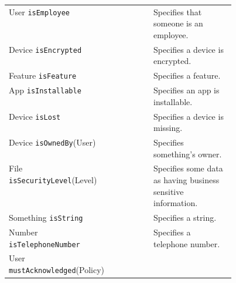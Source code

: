 \documentclass{llncs}
\newcommand{\cmark}{\ding{51}}%
\begin{document}
\begin{table}
\begin{tabular}{l c c c c c p{0.45\linewidth} }
    User \texttt{isEmployee}                    & \cmark                 & \cmark                  &                     & \cmark            & \cmark
    & Specifies that someone is an employee.                                               \\
    Device \texttt{isEncrypted}                 &                        & \cmark                  &                     & \cmark            & \cmark
    & Specifies a device is encrypted.                                                     \\
    Feature \texttt{isFeature}                  & \cmark                 &                         &                     &                   & \cmark
    & Specifies a feature.                                                                 \\
    App \texttt{isInstallable}                  &                        &                         &                     & \cmark            & \cmark
    & Specifies an app is installable.                                                     \\
    Device \texttt{isLost}                      & \cmark                 &                         & \cmark              & \cmark            & \cmark
    & Specifies a device is missing.                                                       \\
    Device \texttt{isOwnedBy}(User)             & \cmark                 & \cmark                  & \cmark              & \cmark            & \cmark
    & Specifies something's owner.                                                         \\
    File \texttt{isSecurityLevel}(Level)        &                        &                         & \cmark              &                   & \cmark
    & Specifies some data as having business sensitive information.                        \\
    Something \texttt{isString}                 & \cmark                 &                         &                     & \cmark            &
    & Specifies a string.                                                                  \\
    Number \texttt{isTelephoneNumber}           &                        &                         &                     & \cmark            & \cmark
    & Specifies a telephone number.                                                        \\
    User \texttt{mustAcknowledged}(Policy)      & \cmark                 & \cmark                  & \cmark              & \cmark            & \cmark

\end{tabular}
\end{table}
\end{document}
